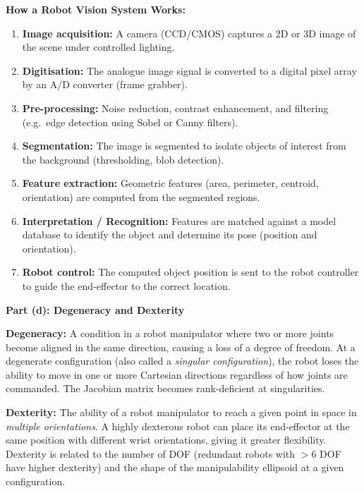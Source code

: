 \documentclass[12pt,a3paper]{article}
\begin{document}
\begin{enumerate}
\begin{tcolorbox}[enhanced,breakable,ansbox,colback=cA!4,colframe=cA,
  boxrule=0.8pt,arc=5pt,
  title={\textbf{Answer}},fonttitle=\bfseries\color{white},colbacktitle=cA]
\textbf{How a Robot Vision System Works:}
\begin{enumerate}[leftmargin=1.5em,itemsep=2pt,label=\arabic*.]
  \item \textbf{Image acquisition:} A camera (CCD/CMOS) captures a 2D or 3D
        image of the scene under controlled lighting.
  \item \textbf{Digitisation:} The analogue image signal is converted to a
        digital pixel array by an A/D converter (frame grabber).
  \item \textbf{Pre-processing:} Noise reduction, contrast enhancement,
        and filtering (e.g.\ edge detection using Sobel or Canny filters).
  \item \textbf{Segmentation:} The image is segmented to isolate objects
        of interest from the background (thresholding, blob detection).
  \item \textbf{Feature extraction:} Geometric features (area, perimeter,
        centroid, orientation) are computed from the segmented regions.
  \item \textbf{Interpretation / Recognition:} Features are matched against
        a model database to identify the object and determine its pose
        (position and orientation).
  \item \textbf{Robot control:} The computed object position is sent to the
        robot controller to guide the end-effector to the correct location.
\end{enumerate}

\hrulefill

\textbf{Part (d): Degeneracy and Dexterity}

\textbf{Degeneracy:} A condition in a robot manipulator where two or more
joints become aligned in the same direction, causing a loss of a degree of
freedom. At a degenerate configuration (also called a \emph{singular
configuration}), the robot loses the ability to move in one or more
Cartesian directions regardless of how joints are commanded. The Jacobian
matrix becomes rank-deficient at singularities.

\textbf{Dexterity:} The ability of a robot manipulator to reach a given point
in space in \emph{multiple orientations}. A highly dexterous robot can place
its end-effector at the same position with different wrist orientations,
giving it greater flexibility. Dexterity is related to the number of DOF
(redundant robots with $>6$ DOF have higher dexterity) and the shape of the
manipulability ellipsoid at a given configuration.


\end{tcolorbox}
\end{enumerate}
\end{document}
